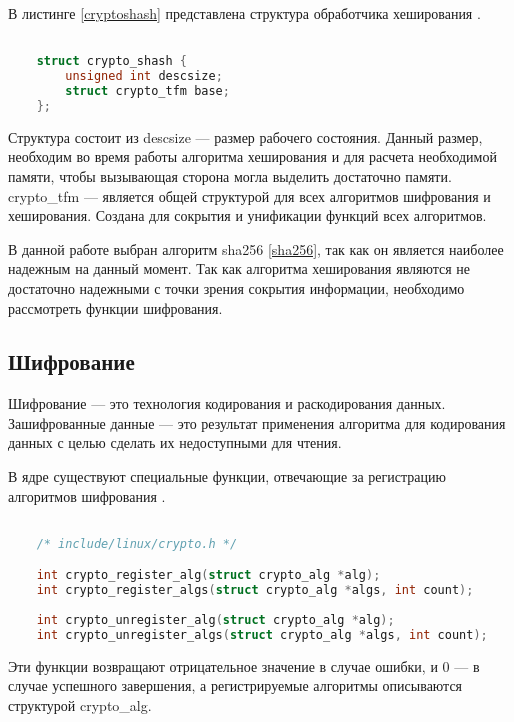 В листинге \ref{cryptoshash} представлена структура обработчика хеширования \cite{structhasg}.

\begin{lstlisting}[language=c, label=cryptoshash, caption=Структура обработчика хеширования.]

    struct crypto_shash {
        unsigned int descsize; 
        struct crypto_tfm base;
    };

\end{lstlisting}

Структура состоит из descsize --- размер рабочего состояния.
Данный размер, необходим во время работы алгоритма хеширования и для расчета необходимой памяти, чтобы вызывающая сторона могла выделить достаточно памяти.
crypto\_tfm --- является общей структурой для всех алгоритмов шифрования и хеширования.
Создана для сокрытия и унификации функций всех алгоритмов.

В данной работе выбран алгоритм sha256 \ref{sha256}, так как он является наиболее надежным на данный момент.
Так как алгоритма хеширования являются не достаточно надежными с точки зрения сокрытия информации, необходимо рассмотреть функции шифрования.

\subsection{Шифрование}

Шифрование \cite{cipher-se} --- это технология кодирования и раскодирования данных. 
Зашифрованные данные --- это результат применения алгоритма для кодирования данных с целью сделать их недоступными для чтения.

В ядре существуют специальные функции, отвечающие за регистрацию алгоритмов шифрования \cite{cipher}.

\begin{lstlisting}[language=c, label=some-code, caption=Регистрация алгоритмов шифрования.]

    /* include/linux/crypto.h */

    int crypto_register_alg(struct crypto_alg *alg);
    int crypto_register_algs(struct crypto_alg *algs, int count);
    
    int crypto_unregister_alg(struct crypto_alg *alg);
    int crypto_unregister_algs(struct crypto_alg *algs, int count);

\end{lstlisting}

Эти функции возвращают отрицательное значение в случае ошибки, и 0 --- в случае успешного завершения,
а регистрируемые алгоритмы описываются структурой crypto\_alg.

